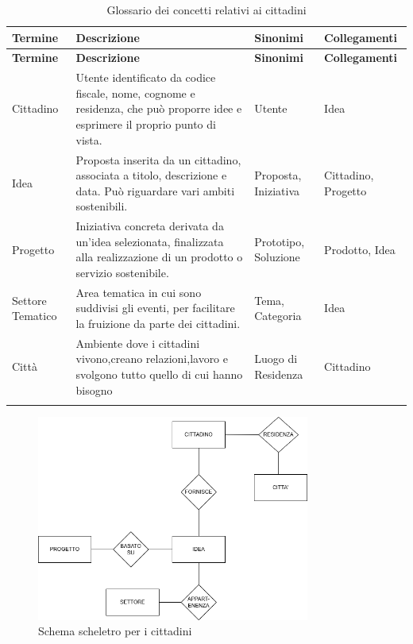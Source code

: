 \documentclass{article}
\begin{document}
\begin{longtable}{|p{3cm}|p{6.5cm}|p{2.5cm}|p{3cm}|}

\hline
\textbf{Termine} & \textbf{Descrizione} & \textbf{Sinonimi} & \textbf{Collegamenti} \\
\hline
\endfirsthead

\hline
\textbf{Termine} & \textbf{Descrizione} & \textbf{Sinonimi} & \textbf{Collegamenti} \\
\hline
\endhead

Cittadino & Utente identificato da codice fiscale, nome, cognome e residenza, che può proporre idee e esprimere il proprio punto di vista. & Utente & Idea \\
\hline

Idea & Proposta inserita da un cittadino, associata a titolo, descrizione e data. Può riguardare vari ambiti sostenibili. & Proposta, Iniziativa & Cittadino, Progetto \\
\hline

Progetto & Iniziativa concreta derivata da un'idea selezionata, finalizzata alla realizzazione di un prodotto o servizio sostenibile. & Prototipo, Soluzione & Prodotto, Idea \\
\hline

Settore Tematico & Area tematica in cui sono suddivisi gli eventi, per facilitare la fruizione da parte dei cittadini. & Tema, Categoria & Idea \\
\hline

Città &  Ambiente dove i cittadini vivono,creano relazioni,lavoro e svolgono tutto quello di cui hanno bisogno & Luogo di Residenza & Cittadino \\
\hline

\caption{Glossario dei concetti relativi ai cittadini}
\label{tab:glossario-cittadini}
\\
\end{longtable}

\begin{figure}[H]
    \centering
    \includegraphics[width=0.8\textwidth]{images/SCHELETRO_CITTADINO.drawio.png}
    \caption{Schema scheletro per i cittadini}
    \label{fig:schema-sostenibilita}
\end{figure}
\end{document}
